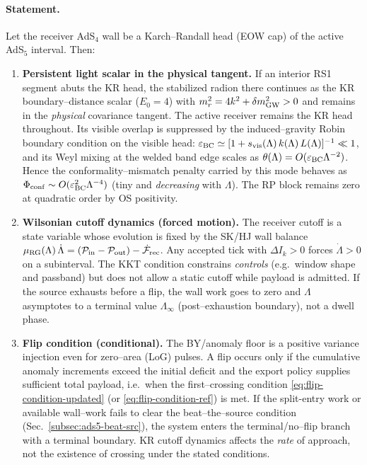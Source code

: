 \documentclass[10pt]{article}
\theoremstyle{definition}
\theoremstyle{plain}
\begin{document}
\paragraph{Statement.}\label{par:uom-main-124}
Let the receiver AdS$_4$ wall be a Karch--Randall head (EOW cap) of the active AdS$_5$ interval. Then:
\begin{enumerate}[label=(K\arabic*), leftmargin=2em]
\item \textbf{Persistent light scalar in the physical tangent.} If an interior RS1 segment abuts the KR head,
the stabilized radion there continues as the KR boundary–distance scalar ($E_0=4$) with
$m_r^2=4k^2+\delta m_{\rm GW}^2>0$ and remains in the \emph{physical} covariance tangent. The active receiver
remains the KR head throughout. Its visible overlap is suppressed by the induced–gravity Robin boundary
condition on the visible head:
\(
\varepsilon_{\rm BC}\simeq [1+s_{\rm vis}(\Lambda)\,k(\Lambda)\,L(\Lambda)]^{-1}\ll 1
\),
and its Weyl mixing at the welded band edge scales as
$\theta(\Lambda)=O(\varepsilon_{\rm BC}\Lambda^{-2})$. Hence the conformality–mismatch penalty carried by this mode behaves as
\(
\Phi_{\rm conf}\sim O(\varepsilon_{\rm BC}^2\Lambda^{-4})
\)
(tiny and \emph{decreasing} with $\Lambda$). The RP block remains zero at quadratic order by OS positivity.

\item \textbf{Wilsonian cutoff dynamics (forced motion).} The receiver cutoff is a state variable
whose evolution is fixed by the SK/HJ wall balance
\(
\mu_{\rm RG}(\Lambda)\,\dot\Lambda=(\mathcal P_{\rm in}-\mathcal P_{\rm out})-\dot{\mathcal F}_{\rm rec}
\).
Any accepted tick with $\Delta I_k>0$ forces $\dot\Lambda>0$ on a subinterval. The KKT condition
constrains \emph{controls} (e.g.\ window shape and passband) but does not allow a static cutoff while
payload is admitted. If the source exhausts before a flip, the wall work goes to zero and $\Lambda$
asymptotes to a terminal value $\Lambda_\infty$ (post--exhaustion boundary), not a dwell phase.

\item \textbf{Flip condition (conditional).} The BY/anomaly floor is a positive variance injection even for
zero--area (LoG) pulses. A flip occurs only if the cumulative anomaly increments exceed the initial deficit
and the export policy supplies sufficient total payload, i.e.\ when the first--crossing condition
\eqref{eq:flip-condition-updated} (or \eqref{eq:flip-condition-ref}) is met. If the split-entry work or
available wall--work fails to clear the beat--the--source condition (Sec.~\ref{subsec:ads5-beat-src}), the
system enters the terminal/no--flip branch with a terminal boundary. KR cutoff dynamics affects the \emph{rate}
of approach, not the existence of crossing under the stated conditions.
\end{enumerate}
\end{document}
